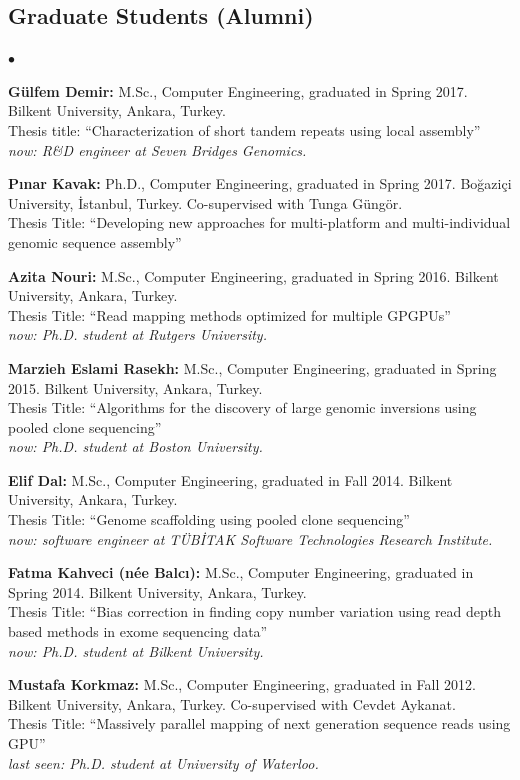\documentclass[margin,line]{res}
\newenvironment{list2}{
  \begin{list}{$\bullet$}{%
      \setlength{\itemsep}{0in}
      \setlength{\parsep}{0in} \setlength{\parskip}{0in}
      \setlength{\topsep}{0in} \setlength{\partopsep}{0in} 
      \setlength{\leftmargin}{0.2in}}}{\end{list}}
\begin{document}
\begin{resume}
\subsection{\small \sc Graduate Students (Alumni)}
\begin{list2}
\item
  {\bf Gülfem Demir:} M.Sc., Computer Engineering, graduated in Spring 2017.
  Bilkent University, Ankara, Turkey. \\
  Thesis title: ``Characterization of short tandem repeats using local assembly''\\
  {\it now: R\&D engineer at Seven Bridges Genomics.}
\item
  {\bf P{\i}nar Kavak:} Ph.D., Computer Engineering, graduated in Spring 2017.
  Bo\u{g}azi\c{c}i University, \.{I}stanbul, Turkey. Co-supervised with Tunga G\"{u}ng\"{o}r.\\
  Thesis Title: ``Developing new approaches for multi-platform and multi-individual genomic sequence assembly''
  \clearpage
\item
  {\bf Azita Nouri:} M.Sc., Computer Engineering, graduated in Spring 2016.
  Bilkent University, Ankara, Turkey.\\
  Thesis Title: ``Read mapping methods optimized for multiple GPGPUs''\\
  {\it now: Ph.D. student at Rutgers University.}
\item
  {\bf Marzieh Eslami Rasekh:} M.Sc., Computer Engineering, graduated in Spring 2015.
  Bilkent University, Ankara, Turkey.\\
  Thesis Title: ``Algorithms for the discovery of large genomic inversions using pooled clone sequencing''\\
  {\it now: Ph.D. student at Boston University.}
\item
  {\bf Elif Dal:} M.Sc., Computer Engineering, graduated in Fall 2014.
  Bilkent University, Ankara, Turkey.\\
  Thesis Title: ``Genome scaffolding using pooled clone sequencing''\\
  {\it now: software engineer at TÜBİTAK Software Technologies Research Institute.}
\item
  {\bf Fatma Kahveci (n\'{e}e Balc{\i}):} M.Sc., Computer Engineering, graduated in Spring 2014.
  Bilkent University, Ankara, Turkey.\\
  Thesis Title: ``Bias correction in finding copy number variation using read depth based methods in exome sequencing data''\\
  {\it now: Ph.D. student at Bilkent University.}
\item
 {\bf Mustafa Korkmaz:} M.Sc., Computer Engineering, graduated in Fall 2012.
  Bilkent University, Ankara, Turkey. Co-supervised with Cevdet Aykanat.\\
  Thesis Title: ``Massively parallel mapping of next generation sequence reads using GPU''\\
  {\it last seen: Ph.D. student at University of Waterloo.}
\end{list2}


\end{resume}
\end{document}
